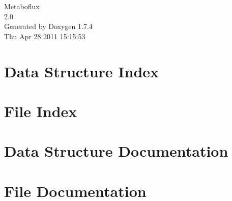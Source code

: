 \documentclass[a4paper]{book}
\begin{document}
\hypersetup{pageanchor=false}
\begin{titlepage}
\vspace*{7cm}
\begin{center}
{\Large Metaboflux \\[1ex]\large 2.0 }\\
\vspace*{1cm}
{\large Generated by Doxygen 1.7.4}\\
\vspace*{0.5cm}
{\small Thu Apr 28 2011 15:15:53}\\
\end{center}
\end{titlepage}
\clearemptydoublepage
{}
\tableofcontents
\clearemptydoublepage
{}
\hypersetup{pageanchor=true}
\chapter{Data Structure Index}

\chapter{File Index}

\chapter{Data Structure Documentation}











\chapter{File Documentation}





















\printindex
\end{document}
